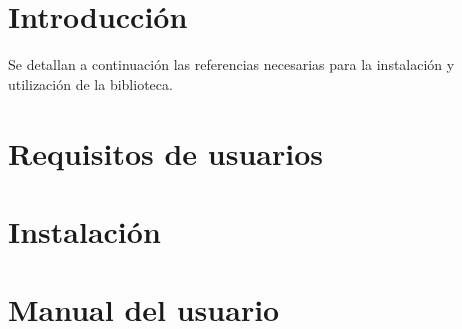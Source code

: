 
\section{Introducción}

Se detallan a continuación las referencias necesarias para la instalación y
utilización de la biblioteca.

\section{Requisitos de usuarios}



\section{Instalación}

\section{Manual del usuario}



